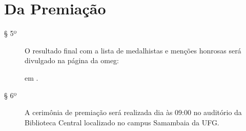 \section*{Da Premiação}

\begin{article}
  \begin{description}
    \item[§ 5º]
      O resultado final com a lista de medalhistas e menções honrosas será
      divulgado na página da \acrshort{omeg}:
      \begin{center}
        \homepage
      \end{center}
      em \resultsFromPhaseTwo.
    \item[§ 6º]
      A cerimônia de premiação será realizada dia \prizesDay{} às 09:00 no
      auditório da Biblioteca Central localizado no campus Samambaia da UFG.
  \end{description}
\end{article}
